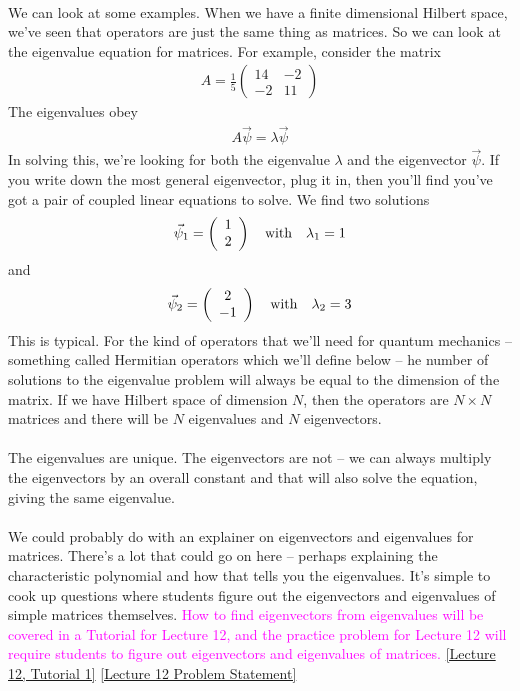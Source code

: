 \documentclass[12pt]{article}
\def\be{\begin{eqnarray}}
\def\ee{\end{eqnarray}}
\newcommand{\nn}{\nonumber}
\newcommand\para{\paragraph{}}
\newcommand{\co}{\color{olive}}
\newcommand{\cblue}{\color{blue}}
\newcommand{\alyssa}{\textcolor{magenta}}
\begin{document}
{\para
We can look at some examples. When we have a finite dimensional Hilbert space, we've seen that operators are just the same thing as matrices. So we can look at the eigenvalue equation for matrices.  {\co For example, consider the matrix
%
\be A  = \frac{1}{5}\left(\begin{array}{cc} 14 & -2 \\ -2 & 11 \end{array}\right)\nn\ee
%
The eigenvalues obey
%
\be A \vec{\psi} = \lambda \vec{\psi}\nn\ee
%
}In solving this, we're looking for both the eigenvalue $\lambda$ and the eigenvector $\vec{\psi}$. If you write down the most general eigenvector, plug it in, then you'll find you've got a pair of coupled linear equations to solve. {\co We find two solutions
%
\be \vec{\psi}_1 = \left(\begin{array}{c} 1 \\ 2\end{array}\right) \ \ \ {\rm with}\ \ \ \lambda_1 = 1\nn\ee
%
and 
\be \vec{\psi}_2 = \left(\begin{array}{c} 2 \\ -1\end{array}\right) \ \ \ {\rm with}\ \ \ \lambda_2 = 3\nn\ee
%
}
This is typical. For the kind of operators that we'll need for quantum mechanics -- something called Hermitian operators which we'll define below -- he number of solutions to the eigenvalue problem will always be equal to the dimension of the matrix. If we have Hilbert space of dimension $N$, then the operators are $N\times N$ matrices and there will be $N$ eigenvalues and $N$ eigenvectors. 

\para
{\co The eigenvalues are unique. The eigenvectors are not -- we can always multiply the eigenvectors by an overall constant and that will also solve the equation, giving the same eigenvalue.}

\para
{\cblue We could probably do with an explainer on eigenvectors and eigenvalues for matrices. There's a lot that could go on here -- perhaps explaining the characteristic polynomial and how that tells you the eigenvalues. It's simple to cook up questions where students figure out the eigenvectors and eigenvalues of simple matrices themselves.} \alyssa{How to find eigenvectors from eigenvalues will be covered in a Tutorial for Lecture 12, and the practice problem for Lecture 12 will require students to figure out eigenvectors and eigenvalues of matrices.} \href{https://drive.google.com/file/d/1xY1QxbzBbt0AyL5X4bBdTMAyDvIMozNq/view?usp=drive_link}{[Lecture 12, Tutorial 1]} \href{https://drive.google.com/file/d/1JFHpnr3PnQu0lyddgoqes3x1bO4-_jMk/view?usp=drive_link}{[Lecture 12 Problem Statement]}


}
\end{document}
